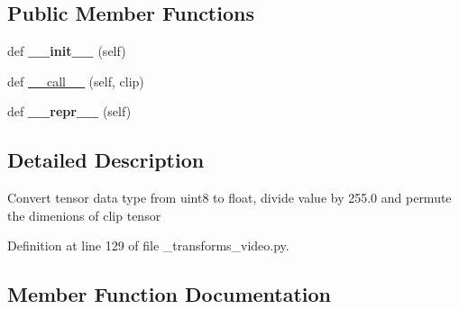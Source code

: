 \subsection*{Public Member Functions}
\begin{DoxyCompactItemize}
\item 
\mbox{\label{classtorchvision_1_1transforms_1_1__transforms__video_1_1ToTensorVideo_af5ca6683762e798c4ef224839983afcd}} 
def {\bfseries \+\_\+\+\_\+init\+\_\+\+\_\+} (self)
\item 
def \hyperlink{classtorchvision_1_1transforms_1_1__transforms__video_1_1ToTensorVideo_a031292cfe0f8203bdcc959a8529c3b1b}{\+\_\+\+\_\+call\+\_\+\+\_\+} (self, clip)
\item 
\mbox{\label{classtorchvision_1_1transforms_1_1__transforms__video_1_1ToTensorVideo_a3e94e0aee856880a2d548d0a0308f7fb}} 
def {\bfseries \+\_\+\+\_\+repr\+\_\+\+\_\+} (self)
\end{DoxyCompactItemize}


\subsection{Detailed Description}
\begin{DoxyVerb}Convert tensor data type from uint8 to float, divide value by 255.0 and
permute the dimenions of clip tensor
\end{DoxyVerb}
 

Definition at line 129 of file \+\_\+transforms\+\_\+video.\+py.



\subsection{Member Function Documentation}
\mbox{\label{classtorchvision_1_1transforms_1_1__transforms__video_1_1ToTensorVideo_a031292cfe0f8203bdcc959a8529c3b1b}} 
